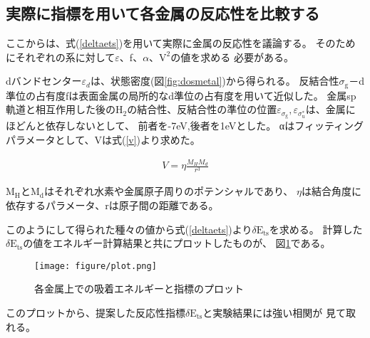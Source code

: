 \documentclass[12pt]{ltjsarticle}
\begin{document}
\subsection{実際に指標を用いて各金属の反応性を比較する}
ここからは、式(\ref{deltaets})を用いて実際に金属の反応性を議論する。
そのためにそれぞれの系に対して$\varepsilon$、f、$\alpha$、$\text{V}^\text{2}$の値を求める
必要がある。

dバンドセンター$\varepsilon_d$は、状態密度(図\ref{fig:dosmetal})から得られる。
反結合性$\sigma_\text{g}$－d準位の占有度fは表面金属の局所的なd準位の占有度を用いて近似した。
金属sp軌道と相互作用した後の$\text{H}_\text{2}$の結合性、反結合性の準位の位置$\varepsilon _
{\sigma_\text{g}},\varepsilon _{\sigma_\text{u}^*}$は、金属にほどんと依存しないとして、
前者を-7eV,後者を1eVとした。
αはフィッティングパラメータとして、Vは式(\ref{v})より求めた。\cite{Norskov1989}

\begin{eqnarray}
    \label{v}
    V = \eta \frac{ M_H M_d }{r^3}
\end{eqnarray}

$\text{M}_\text{H}$と$\text{M}_\text{d}$はそれぞれ水素や金属原子周りのポテンシャルであり、
$\eta$は結合角度に依存するパラメータ、rは原子間の距離である。

このようにして得られた種々の値から式(\ref{deltaets})より$\delta \text{E}_\text{ts}$を求める。
計算した$\delta \text{E}_\text{ts}$の値をエネルギー計算結果と共にプロットしたものが、
図\ref{fig:plot}である。

\begin{figure}[hbtp]
    \begin{center}
     \texttt{[image: figure/plot.png]}
    \end{center}
    \caption{各金属上での吸着エネルギーと指標のプロット}
    \label{fig:plot}
\end{figure}
このプロットから、提案した反応性指標$\delta \text{E}_\text{ts}$と実験結果には強い相関が
見て取れる。
\end{document}
